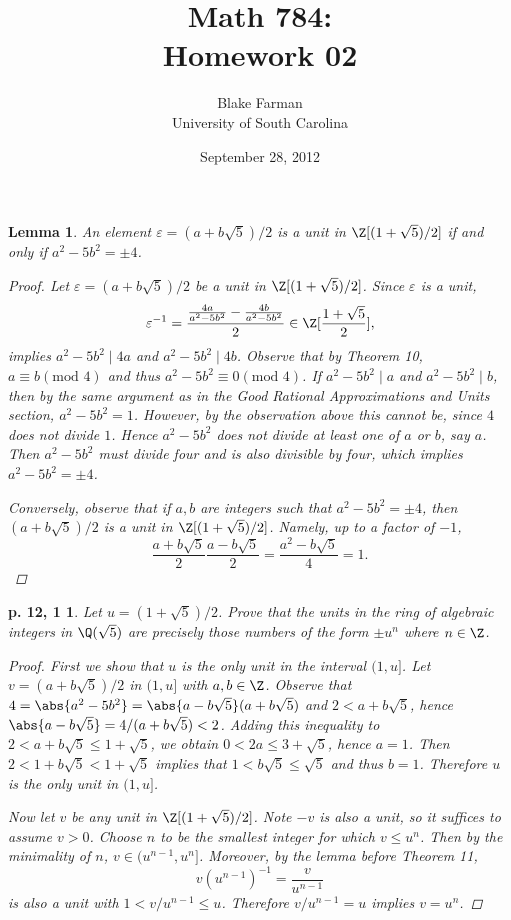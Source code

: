 \documentclass[10pt]{amsart}
\author{Blake Farman\\University of South Carolina}
\title{Math 784:\\Homework 02}
\date{September 28, 2012}
\begin{document}
\maketitle

\newtheorem*{ex1}{p. 12, 1}
\newtheorem*{ex2}{p. 30, 2}
\newtheorem*{ex3}{p. 34, 1}
\newtheorem{lem}{Lemma}

\begin{lem}
  An element $\varepsilon = (a + b\sqrt{5})/2$ is a unit in $\Z[(1 + \sqrt{5})/2]$ if and only if $a^2 - 5b^2 = \pm 4$.
  \begin{proof}
    Let $\varepsilon = (a + b\sqrt{5})/2$ be a unit in $\Z[(1 + \sqrt{5})/2]$.
    Since $\varepsilon$ is a unit, $$\varepsilon^{-1} = \frac{\frac{4a}{a^2 - 5b^2} - \frac{4b}{a^2 - 5b^2}}{2} \in \Z[\frac{1 + \sqrt{5}}{2}],$$
    implies $a^2 - 5b^2 \mid 4a$ and $a^2 - 5b^2 \mid 4b$.
    Observe that by Theorem 10, $a \equiv b (\text{mod } 4)$ and thus $a^2 - 5b^2 \equiv 0 (\text{mod } 4)$.
    If $a^2 - 5b^2 \mid a$ and $a^2 - 5b^2 \mid b$, then by the same argument as in the Good Rational Approximations and Units section, $a^2 - 5b^2 = 1$.
    However, by the observation above this cannot be, since $4$ does not divide $1$.
    Hence $a^2 - 5b^2$ does not divide at least one of $a$ or $b$, say $a$.
    Then $a^2 - 5b^2$ must divide four and is also divisible by four, which implies $a^2 - 5b^2 = \pm 4$. 
    
    Conversely, observe that if $a,b$ are integers such that $a^2 - 5b^2 = \pm 4$, then $(a + b\sqrt{5})/2$ is a unit in $\Z[(1 + \sqrt{5})/2]$.
    Namely, up to a factor of $-1$, $$\frac{a + b\sqrt{5}}{2}\frac{a - b\sqrt{5}}{2} = \frac{a^2 - b\sqrt{5}}{4} = 1.$$
  \end{proof}
\end{lem}
\begin{ex1}
  Let $u = (1 + \sqrt{5})/2$.
  Prove that the units in the ring of algebraic integers in $\Q(\sqrt{5})$ are precisely those numbers of the form $\pm u^n$ where $n \in \Z$. 
  \begin{proof}
    First we show that $u$ is the only unit in the interval $(1,u]$.
      Let $v = (a+b\sqrt{5})/2$ in $(1,u]$ with $a,b \in \Z$.  
        Observe that $4 = \abs{a^2 - 5b^2} = \abs{a - b\sqrt{5}}(a + b\sqrt{5})$ and $2 < a + b\sqrt{5}$, hence $\abs{a - b\sqrt{5}} = 4/(a + b\sqrt{5}) < 2$.
        Adding this inequality to $2 < a + b\sqrt{5} \leq 1 + \sqrt{5}$, we obtain $0 < 2a \leq 3 + \sqrt{5}$, hence $a = 1$.
        Then $2 < 1 + b\sqrt{5} < 1 + \sqrt{5}$ implies that $1 < b\sqrt{5} \leq \sqrt{5}$ and thus $b = 1$.
        Therefore $u$ is the only unit in $(1,u]$.
          
          Now let $v$ be any unit in $\Z[(1 + \sqrt{5})/2]$.
          Note $-v$ is also a unit, so it suffices to assume $v > 0$.
          Choose $n$ to be the smallest integer for which $v \leq u^n$.
          Then by the minimality of $n$, $v \in (u^{n-1}, u^n]$.
          Moreover, by the lemma before Theorem 11,
          $$v(u^{n-1})^{-1} = \frac{v}{u^{n-1}}$$
          is also a unit with $1 < v/u^{n-1} \leq u$.
          Therefore $v/u^{n-1} = u$ implies $v = u^n$.
  \end{proof}
\end{ex1}
\end{document}
